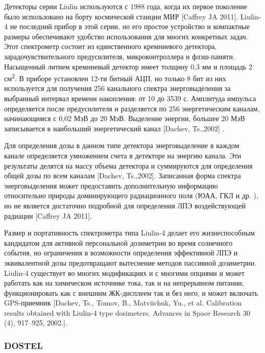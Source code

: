 Детекторы серии Liulin используются с 1988 года, когда их первое поколение было использовано на борту космической станции МИР [Caffrey JA 2011]. Liulin-4 не последний прибор в этой серии, но его простое устройство и компактные размеры обеспечивают удобство использования для многих конкретных задач. Этот спектрометр состоит из единственного кремниевого детектора, зарадочувствительного предусилителя, микроконтроллера и флэш-памяти. Насыщенный литием кремниевый детектор имеет толщину 0,3 мм и площадь 2 см\textsuperscript{2}. В приборе установлен 12-ти битный АЦП, но только 8 бит из них используется для получения 256 канального спектра энерговыделения за выбранный интервал времени накопления: от 10 до 3539 с. Амплитуда импульса определяется после предусилителя и разделяется по 256 энергетическим каналам, начинающимся с 0,02 МэВ до 20 МэВ. Выделение энергии, большее 20 МэВ записывается в наибольший энергетический канал [Dachev, Ts.,2002] .


Для определения дозы в данном типе детектора энерговыделение в каждом канале определяется умножением счета в детекторе на энергию канала. Эти результаты делятся на массу объема детектора и суммируются для определения общей дозы по всем каналам [Dachev, Ts.,2002]. Записанная форма спектра энерговыделения может предоставить дополнительную информацию относительно природы доминирующего радиационного поля (ЮАА, ГКЛ и др. ), но не является достаточно подробной для определения ЛПЭ воздействующей радиации [Caffrey JA 2011]. 


Размер и портативность спектрометра типа Liulin-4 делает его жизнеспособным кандидатом для активной персональной дозиметрии во время солнечного события, но ограничения в возможности определения эффективной ЛПЭ и эквивалентной дозы предотвращают вытеснение методов пассивной дозиметрии. Liulin-4 существует во многих модификациях и с многими опциями и может работать как на химическом источнике тока, так и на непрерывном питании, функционировать как с внешним ЖК-дисплеем так и без него, и может включать GPS-приемник [Dachev, Ts., Tomov, B., Matviichuk, Yu., et al. Calibration results obtained with Liulin-4 type dosimeters. Advances in Space Research 30 (4), 917--925, 2002.].	


\subsubsection{DOSTEL}

